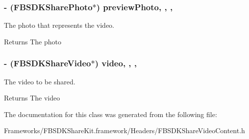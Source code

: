 \subsubsection[{preview\+Photo}]{\setlength{\rightskip}{0pt plus 5cm}-\/ ({\bf F\+B\+S\+D\+K\+Share\+Photo}$\ast$) preview\+Photo\hspace{0.3cm}{\ttfamily [read]}, {\ttfamily [write]}, {\ttfamily [nonatomic]}, {\ttfamily [copy]}}\label{interface_f_b_s_d_k_share_video_content_a3a4422e8ca98246301cd55ecf6689e8b}
The photo that represents the video. \begin{DoxyReturn}{Returns}
The photo 
\end{DoxyReturn}
\hypertarget{interface_f_b_s_d_k_share_video_content_a7808add937d3fe59f3589e9e48d04612}{}
\subsubsection[{video}]{\setlength{\rightskip}{0pt plus 5cm}-\/ ({\bf F\+B\+S\+D\+K\+Share\+Video}$\ast$) video\hspace{0.3cm}{\ttfamily [read]}, {\ttfamily [write]}, {\ttfamily [nonatomic]}, {\ttfamily [copy]}}\label{interface_f_b_s_d_k_share_video_content_a7808add937d3fe59f3589e9e48d04612}
The video to be shared. \begin{DoxyReturn}{Returns}
The video 
\end{DoxyReturn}


The documentation for this class was generated from the following file\+:\begin{DoxyCompactItemize}
\item 
Frameworks/\+F\+B\+S\+D\+K\+Share\+Kit.\+framework/\+Headers/F\+B\+S\+D\+K\+Share\+Video\+Content.\+h\end{DoxyCompactItemize}
